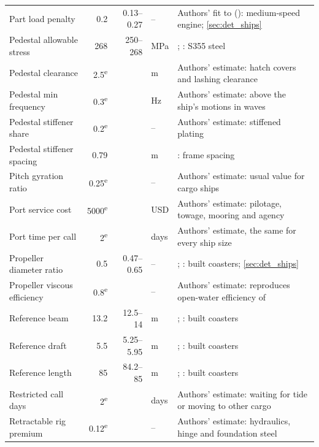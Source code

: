\begin{longtable}{@{}>{\raggedright\arraybackslash}p{3.4cm}rr>{\raggedright\arraybackslash}p{1.4cm}>{\raggedright\arraybackslash}p{5.8cm}@{}}
Part load penalty & \num{0.2} & \num{0.13}--\num{0.27} & -- & Authors' fit to (\citealp[p. 137]{man2024l2131}): medium-speed engine; \cref{sec:det_ships} \\
Pedestal allowable stress & \num{268} & \num{250}--\num{268} & MPa & \citet[Sec 5, 4.4.1]{bv2026nr206}; \citet{constructalia2026s355}: S355 steel \\
Pedestal clearance & \num{2.5}\textsuperscript{e} &  & m & Authors' estimate: hatch covers and lashing clearance \\
Pedestal min frequency & \num{0.3}\textsuperscript{e} &  & Hz & Authors' estimate: above the ship's motions in waves \\
Pedestal stiffener share & \num{0.2}\textsuperscript{e} &  & -- & Authors' estimate: stiffened plating \\
Pedestal stiffener spacing & \num{0.79} &  & m & \citet[p. 128]{souadji2012}: frame spacing \\
Pitch gyration ratio & \num{0.25}\textsuperscript{e} &  & -- & Authors' estimate: usual value for cargo ships \\
Port service cost & \num{5000}\textsuperscript{e} &  & USD & Authors' estimate: pilotage, towage, mooring and agency \\
Port time per call & \num{2}\textsuperscript{e} &  & days & Authors' estimate, the same for every ship size \\
Propeller diameter ratio & \num{0.5} & \num{0.47}--\num{0.65} & -- & \citet{damen2025cf3850}; \citet{wagenborg2024ferus4300}: built coasters; \cref{sec:det_ships} \\
Propeller viscous efficiency & \num{0.8}\textsuperscript{e} &  & -- & Authors' estimate: reproduces open-water efficiency of \citet{man2011} \\
Reference beam & \num{13.2} & \num{12.5}--\num{14} & m & \citet{conoship2023cip3800}; \citet{damen2025cf3850}: built coasters \\
Reference draft & \num{5.5} & \num{5.25}--\num{5.95} & m & \citet{damen2025cf3850}; \citet{conoship2023cip3800}: built coasters \\
Reference length & \num{85} & \num{84.2}--\num{85} & m & \citet{damen2025cf3850}; \citet{conoship2023cip3800}: built coasters \\
Restricted call days & \num{2}\textsuperscript{e} &  & days & Authors' estimate: waiting for tide or moving to other cargo \\
Retractable rig premium & \num{0.12}\textsuperscript{e} &  & -- & Authors' estimate: hydraulics, hinge and foundation steel \\

\end{longtable}
